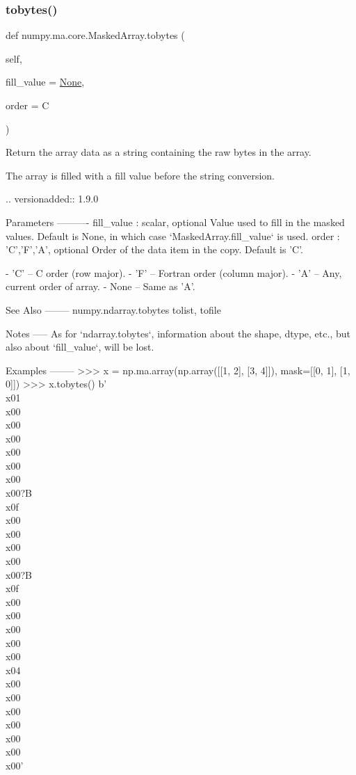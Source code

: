 \subsubsection{\texorpdfstring{tobytes()}{tobytes()}}
{\footnotesize\ttfamily def numpy.\+ma.\+core.\+Masked\+Array.\+tobytes (\begin{DoxyParamCaption}\item[{}]{self,  }\item[{}]{fill\+\_\+value = {\ttfamily \hyperlink{namespacenumpy_1_1ma_1_1core_a647ee1848dfa3692fe35a663a2aa40b3}{None}},  }\item[{}]{order = {\ttfamily \textquotesingle{}C\textquotesingle{}} }\end{DoxyParamCaption})}

\begin{DoxyVerb}Return the array data as a string containing the raw bytes in the array.

The array is filled with a fill value before the string conversion.

.. versionadded:: 1.9.0

Parameters
----------
fill_value : scalar, optional
    Value used to fill in the masked values. Default is None, in which
    case `MaskedArray.fill_value` is used.
order : {'C','F','A'}, optional
    Order of the data item in the copy. Default is 'C'.

    - 'C'   -- C order (row major).
    - 'F'   -- Fortran order (column major).
    - 'A'   -- Any, current order of array.
    - None  -- Same as 'A'.

See Also
--------
numpy.ndarray.tobytes
tolist, tofile

Notes
-----
As for `ndarray.tobytes`, information about the shape, dtype, etc.,
but also about `fill_value`, will be lost.

Examples
--------
>>> x = np.ma.array(np.array([[1, 2], [3, 4]]), mask=[[0, 1], [1, 0]])
>>> x.tobytes()
b'\\x01\\x00\\x00\\x00\\x00\\x00\\x00\\x00?B\\x0f\\x00\\x00\\x00\\x00\\x00?B\\x0f\\x00\\x00\\x00\\x00\\x00\\x04\\x00\\x00\\x00\\x00\\x00\\x00\\x00'\end{DoxyVerb}

